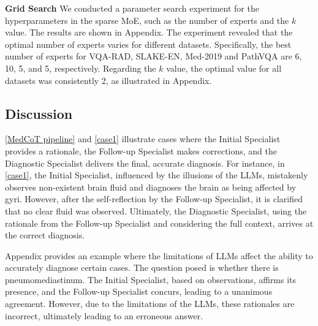 \documentclass[11pt]{article}
\begin{document}

\noindent\textbf{Grid Search}
We conducted a parameter search experiment for the hyperparameters in the sparse MoE, such as the number of experts and the \( k \) value. The results are shown in Appendix. The experiment revealed that the optimal number of experts varies for different datasets. Specifically, the best number of experts for VQA-RAD, SLAKE-EN, Med-2019 and PathVQA are 6, 10, 5, and 5, respectively. Regarding the \( k \) value, the optimal value for all datasets was consistently 2, as illustrated in Appendix.
\subsection{Discussion}

\autoref{MedCoT pipeline} and \autoref{case1} illustrate cases where the Initial Specialist provides a rationale, the Follow-up Specialist makes corrections, and the Diagnostic Specialist delivers the final, accurate diagnosis. For instance, in \autoref{case1}, the Initial Specialist, influenced by the illusions of the LLMs, mistakenly observes non-existent brain fluid and diagnoses the brain as being affected by gyri. However, after the self-reflection by the Follow-up Specialist, it is clarified that no clear fluid was observed. Ultimately, the Diagnostic Specialist, using the rationale from the Follow-up Specialist and considering the full context, arrives at the correct diagnosis.

Appendix provides an example where the limitations of LLMs affect the ability to accurately diagnose certain cases. 
The question posed is whether there is pneumomediastinum. The Initial Specialist, based on observations, affirms its presence, and the Follow-up Specialist concurs, leading to a unanimous agreement. However, due to the limitations of the LLMs, these rationales are incorrect, ultimately leading to an erroneous answer.
\end{document}

